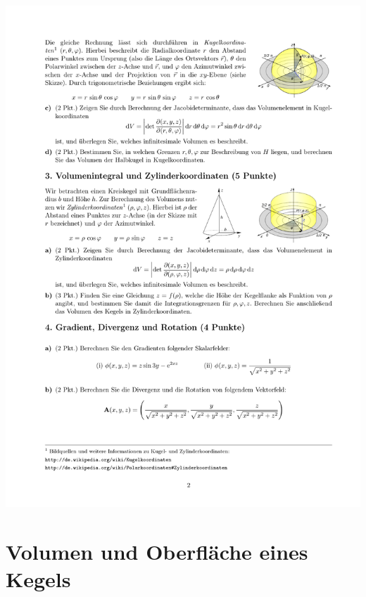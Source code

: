 \documentclass{scrartcl}
\begin{document}
\begin{center}
    \includegraphics{img/sphere_coord.pdf}
\end{center}


\section{Volumen und Oberfläche eines Kegels }
\label{sec:volumenintegral_ii}
\end{document}
